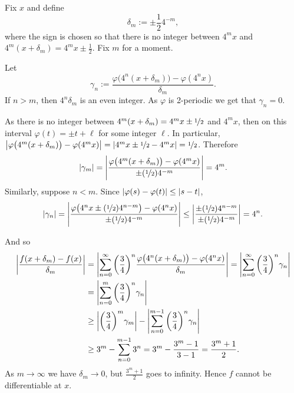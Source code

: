 \begin{example}
Fix $x$ and
define
\begin{equation*}
\delta_m := \pm \frac{1}{2} 4^{-m} ,
\end{equation*}
where the sign is chosen so that there is no integer
between $4^m x$ and $4^m(x+\delta_m) = 4^m x \pm \frac{1}{2}$.
Fix $m$ for a moment.

Let
\begin{equation*}
\gamma_{n} :=
\frac{\varphi\bigl(4^n(x+\delta_m)\bigr)-\varphi(4^nx)}{\delta_m} .
\end{equation*}
If $n > m$, then $4^n\delta_m$ is an even integer.  As $\varphi$
is 2-periodic we get that $\gamma_n = 0$.

As there is no integer between 
$4^m(x+\delta_m) = 4^m x\pm\nicefrac{1}{2}$ and $4^m x$, then on this interval
$\varphi(t) = \pm t + \ell$ for some integer $\ell$.
In particular,
$\left\lvert {\varphi\bigl(4^m(x+ \delta_m)\bigr)-\varphi(4^mx)} \right\rvert =
\left\lvert {4^mx\pm\nicefrac{1}{2}-4^mx} \right\rvert = \nicefrac{1}{2}$.  Therefore
\begin{equation*}
\lvert {\gamma_m} \rvert =
\left\lvert {
\frac{\varphi\bigl(4^m(x+\delta_m)\bigr)-\varphi(4^mx)}{\pm (\nicefrac{1}{2}) 4^{-m}}
} \right\rvert
= 4^m .
\end{equation*}
Similarly, suppose $n < m$.  Since $\lvert {\varphi(s) -\varphi(t)} \rvert \leq
\lvert {s-t} \rvert$,
\begin{equation*}
\lvert {\gamma_n} \rvert =
\left\lvert {\frac{\varphi\bigl(4^nx\pm(\nicefrac{1}{2})4^{n-m}\bigr)-\varphi(4^nx)}{\pm
(\nicefrac{1}{2}) 4^{-m}}} \right\rvert
\leq
\left\lvert {\frac{\pm(\nicefrac{1}{2})4^{n-m}}{\pm (\nicefrac{1}{2}) 4^{-m}}} \right\rvert = 4^n
.
\end{equation*}

And so
\begin{equation*}
\begin{split}
\left\lvert {
\frac{f(x+\delta_m)-f(x)}{\delta_m}
} \right\rvert
& =
\left\lvert {
\sum_{n=0}^\infty 
{\left(\frac{3}{4}\right)}^n
\frac{\varphi\bigl(4^n(x+\delta_m)\bigr)-\varphi(4^nx)}{\delta_m}
} \right\rvert
=
\left\lvert {
\sum_{n=0}^\infty 
{\left(\frac{3}{4}\right)}^n
\gamma_n
} \right\rvert
\\
& =
\left\lvert {
\sum_{n=0}^m 
{\left(\frac{3}{4}\right)}^n
\gamma_n
} \right\rvert
\\
& \geq
\left\lvert {
{\left(\frac{3}{4}\right)}^m
\gamma_m} \right\rvert
-
\left\lvert {
\sum_{n=0}^{m-1} 
{\left(\frac{3}{4}\right)}^n
\gamma_n
} \right\rvert
\\
& \geq
3^m
-
\sum_{n=0}^{m-1} 
3^n
=
3^m
-
\frac{3^{m}-1}{3-1}
=
\frac{3^m +1}{2} .
\end{split}
\end{equation*}
As $m \to \infty$ we have
$\delta_m \to 0$, but $\frac{3^m+1}{2}$
goes to infinity.  Hence $f$ cannot be differentiable at $x$.
\end{example}

